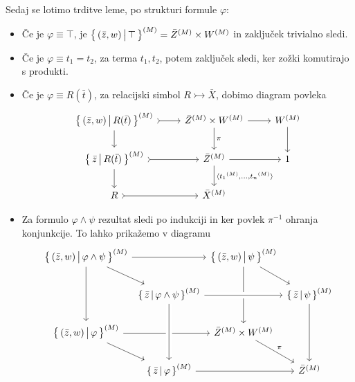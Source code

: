 \documentclass[../kategoricna_logika.tex]{subfiles}
\begin{document}
\begin{dokaz}
\begin{itemize}
    \end{itemize}
      Sedaj se lotimo trditve leme, po strukturi formule $\varphi$:
    \begin{itemize}
      \item Če je $\varphi \equiv \top$, je $\left\lbrace\,(\bar{z}, w) \,\middle|\, \top\,\right\rbrace^{(M)} = {\bar{Z}}^{(M)} \times {W}^{(M)}$
        in zaključek trivialno sledi.
      
      \item Če je $\varphi \equiv t_1 = t_2$, za terma $t_1, t_2$, potem zaključek sledi,
        ker zožki komutirajo s produkti.
      
      \item
        Če je $\varphi \equiv R(\bar{t})$, za relacijski simbol $R \rightarrowtail \bar{X}$,
        dobimo diagram povleka
        \begin{equation*}
        \begin{tikzcd}[column sep=normal]
          \set{(\bar{z},w) \,\middle|\, R(\bar{t})}^{(M)} \ar[d] \ar[r, tail] & \interp{\bar{Z}} \times \interp{W} \ar[d, "\pi"] \ar[r] & \interp{W} \ar[d] \\
          \set{\bar{z} \,\middle|\, R(\bar{t})}^{(M)} \ar[d] \ar[r, tail] & \interp{\bar{Z}} \ar[d, "\fprod{\interp{t_1}, \ldots, \interp{t_n}}"] \ar[r] & 1 \\
          R \ar[r, tail] & \interp{\bar{X}}
        \end{tikzcd}
        \end{equation*}
      
      \item
        Za formulo $\varphi \land \psi$ rezultat sledi po indukciji in ker povlek $\pi^{-1}$ ohranja konjunkcije.
        To lahko prikažemo v diagramu
        \begin{equation*}
        \begin{tikzcd}[row sep=normal, column sep=0.2em]
          \setb{(\bar{z}, w)}{\varphi \land \psi}^{(M)} \ar[dd] \ar[dr] \ar[rr] & & \setb{(\bar{z}, w)}{\psi}^{(M)} \ar[dd] \ar[dr] \\
          & \setb{\bar{z}}{\varphi \land \psi}^{(M)}   \ar[rr, crossing over] && \setb{\bar{z}}{\psi}^{(M)} \ar[dd] \\
          \setb{(\bar{z}, w)}{\varphi}^{(M)} \ar[dr] \ar[rr]  & & \bar{Z}^{(M)} \times \interp{W} \ar[dr, "\pi"] \\
          & \setb{\bar{z}}{\varphi}^{(M)} \ar[rr] \ar[from=uu, crossing over] && \interp{\bar{Z}}
        \end{tikzcd}
        \end{equation*}


\end{itemize}
\end{dokaz}
\end{document}
